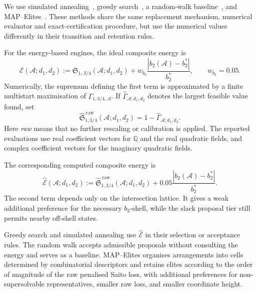 \documentclass[pdflatex,sn-mathphys-num]{sn-jnl}%
\theoremstyle{remark}
\theoremstyle{definition}
\begin{document}
We use simulated annealing~\cite{Kirkpatrick1983}, greedy search~\cite{Cuntz2021}, a random-walk baseline~\cite{Solis1981}, and MAP--Elites~\cite{mouret2015illuminatingsearchspacesmapping,Cully2018-nm}. These methods share the same replacement mechanism, numerical evaluator and exact-certification procedure, but use the numerical values differently in their transition and retention rules.

For the energy-based engines, the ideal composite energy is
\begin{equation}
\label{eq:ideal-search-energy}
\mathcal E(\mathcal{A};d_1,d_2)
:=
\mathfrak S_{1,\,3/4}(\mathcal{A};d_1,d_2)
+w_{b_2}
\frac{|b_2(\mathcal{A})-b_2^*|}{b_2^*},
\qquad
w_{b_2}=0.05.
\end{equation}
Numerically, the supremum defining the first term is approximated by a finite multistart maximisation of $\Gamma_{1,3/4,\mathcal{A}}$. If $\widehat{\Gamma}_{\mathcal{A};d_1,d_2}$ denotes the largest feasible value found, set
\[
\widehat{\mathfrak S}^{\,\mathrm{raw}}_{1,3/4}
(\mathcal{A};d_1,d_2)
=
1-\widehat{\Gamma}_{\mathcal{A};d_1,d_2}.
\]
Here \emph{raw} means that no further rescaling or calibration is applied. The reported evaluations use real coefficient vectors for $\mathbb Q$ and the real quadratic fields, and complex coefficient vectors for the imaginary quadratic fields.

The corresponding computed composite energy is
\begin{equation}
\label{eq:production-energy}
\widehat{\mathcal E}(\mathcal{A};d_1,d_2)
:=
\widehat{\mathfrak S}^{\,\mathrm{raw}}_{1,3/4}
(\mathcal{A};d_1,d_2)
+0.05
\frac{|b_2(\mathcal{A})-b_2^*|}{b_2^*}.
\end{equation}
The second term depends only on the intersection lattice. It gives a weak additional preference for the necessary $b_2$-shell, while the slack proposal tier still permits nearby off-shell states.

Greedy search and simulated annealing use $\widehat{\mathcal E}$ in their selection or acceptance rules. The random walk accepts admissible proposals without consulting the energy and serves as a baseline. MAP--Elites organises arrangements into cells determined by combinatorial descriptors and retains elites according to the order of magnitude of the raw penalised Saito loss, with additional preferences for non-supersolvable representatives, smaller raw loss, and smaller coordinate height. 
\end{document}
